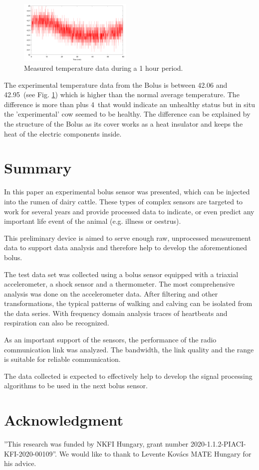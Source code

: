 \documentclass[conference]{IEEEtran}
\begin{document}
\begin{figure}[htbp]
\centerline{\includegraphics[width=0.48\textwidth]{fig/temp-plot.png}}
  \caption{Measured temperature data during a 1 hour period.}
\label{temp-plot}
\end{figure}


The experimental temperature data from the Bolus is between 42.06 and 42.95\textcelsius\ (see Fig. \ref{temp-plot})
which is higher than the normal average temperature. The
difference is more than plus 4\textcelsius\  that would indicate an unhealthy
status but in situ the 'experimental' cow seemed to be healthy. The difference
can be explained by the structure of the Bolus as its cover works as a heat
insulator and keeps the heat of the electric components inside.

\section{Summary}

In this paper an experimental bolus sensor was presented, which can be injected
into the rumen of dairy cattle. These types of complex sensors are targeted
to work for several years and provide processed data to indicate, or even
predict any important life event of the animal (e.g. illness or oestrus).

This preliminary device is aimed to serve enough raw, unprocessed measurement
data to support data analysis and therefore help to develop the aforementioned
bolus.

The test data set was collected using a bolus sensor equipped with a triaxial
accelerometer, a shock sensor and a thermometer. The most comprehensive analysis
was done on the accelerometer data. After filtering and other transformations,
the typical patterns of walking and calving
can be isolated from the data series. With frequency domain analysis traces of
heartbeats and respiration can also be recognized.

As an important support of the
sensors, the performance of the radio communication link was analyzed. The bandwidth,
the link quality and the range is suitable for reliable communication.

The data collected is expected to effectively help to develop the signal processing
algorithms to be used in the next bolus sensor.

\section*{Acknowledgment}

''This research was funded by NKFI Hungary, grant number
2020-1.1.2-PIACI-KFI-2020-00109''. We would like to thank to Levente Kovács
MATE Hungary for his advice.



\end{document}

